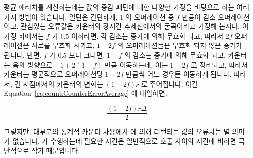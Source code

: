 \begin{enumerate}
	평균 에러치를 계산하는데는 값의 증감 패턴에 대한 다양한 가정을 바탕으로
	하는 여러가지 방법이 있습니다.
	일단은 간단하게, 1 의 오퍼레이션 중 $f$ 만큼이 감소 오퍼레이션이고,
	관심있는 오류값은 카운터의 장시간 추세선에서의 굴곡이라고 가정해
	봅시다.
	이 가정 하에서는 $f$ 가 0.5 이하라면, 각 감소는 증가에 의해 무효화
	되고, 따라서 $2f$ 오퍼레이션은 서로를 무효화 시키고, $1-2f$ 의
	오퍼레이션들은 무효화 되지 않은 증가가 됩니다.
	반면, $f$ 가 0.5 보다 크다면, $1-f$ 의 감소는 증가에 의해 무효화 되고,
	카운터는 음의 방향으로 $-1+2\left(1-f\right)$ 만큼 이동하는데, 이는
	$1-2f$ 로 정리되고, 따라서 카운터는 평균적으로 오퍼레이션당 $1-2f$
	만큼씩 어느 경우든 이동하게 됩니다.
	따라서, 긴 시점에서의 카운터의 변화는 $\left( 1-2f \right) r$ 로
	주어집니다.
	이걸 Equation~\ref{eq:count:CounterErrorAverage} 에 대입하면:

	\begin{equation}
		\frac{\left( 1 - 2 f \right) r \Delta}{2}
	\end{equation}

	그렇지만, 대부분의 통계적 카운터 사용에서  에 의해
	리턴되는 값의 오류치는 별 의미가 없습니다.
	 가 수행하는데 필요한 시간은 일반적으로
	 호출 사이의 시간에 비하면 극단적으로 작기 때문입니다.
	\iffalse


\end{enumerate}
